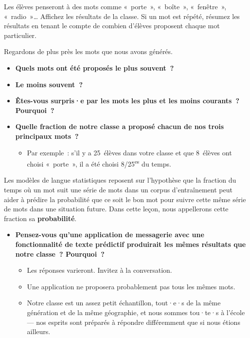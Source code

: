 \documentclass[12pt,a4paper]{article}
\begin{document}
\begin{instructornotes}
  Les élèves penseront à des mots comme «~porte~», «~boîte~», «~fenêtre~», «~radio~»… Affichez les résultats de la classe. Si un mot est répété, résumez les résultats en tenant le compte de combien d'élèves proposent chaque mot particulier.
\end{instructornotes}

\begin{thinkbox}
  Regardons de plus près les mots que nous avons générés.
  \begin{itemize}
    \item \textbf{Quels mots ont été proposés le plus souvent~?}
    \item \textbf{Le moins souvent~?}
    \item \textbf{Êtes-vous surpris·e par les mots les plus et les moins courants~? Pourquoi~?}
    \item \textbf{Quelle fraction de notre classe a proposé chacun de nos trois principaux mots~?}
    \begin{itemize}
      \item Par exemple~: s'il y a 25~élèves dans votre classe et que 8~élèves ont choisi «~porte~», il a été choisi 8/25\textsuperscript{es} du temps.
    \end{itemize}
  \end{itemize}
\end{thinkbox}

\begin{keypointbox}
  Les modèles de langue statistiques reposent sur l'hypothèse que la fraction du temps où un mot suit une série de mots dans un corpus d'entraînement peut aider à prédire la probabilité que ce soit le bon mot pour suivre cette même série de mots dans une situation future. Dans cette leçon, nous appellerons cette fraction sa \textbf{probabilité}.
\end{keypointbox}

\begin{thinkbox}
  \begin{itemize}
    \item \textbf{Pensez-vous qu'une application de messagerie avec une fonctionnalité de texte prédictif produirait les mêmes résultats que notre classe~? Pourquoi~?}
    \begin{itemize}
      \item Les réponses varieront. Invitez à la conversation.
      \item Une application ne proposera probablement pas tous les mêmes mots.
      \item Notre classe est un assez petit échantillon, tout·e·s de la même génération et de la même géographie, et nous sommes tou·te·s à l'école — nos esprits sont préparés à répondre différemment que si nous étions ailleurs.
    \end{itemize}
  \end{itemize}
\end{thinkbox}
\end{document}
